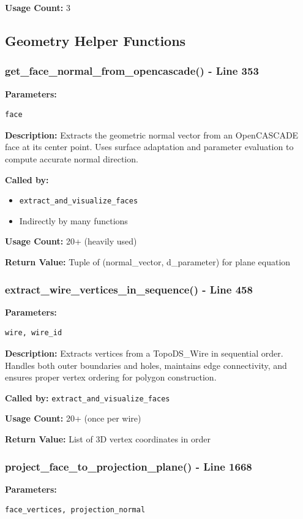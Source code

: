 \documentclass[11pt,a4paper]{article}
\begin{document}
\textbf{Usage Count:} 3

\subsection{Geometry Helper Functions}

\subsubsection{get\_face\_normal\_from\_opencascade() - Line 353}
\textbf{Parameters:}
\begin{lstlisting}[language=Python]
face
\end{lstlisting}

\textbf{Description:}
Extracts the geometric normal vector from an OpenCASCADE face at its center point. Uses surface adaptation and parameter evaluation to compute accurate normal direction.

\textbf{Called by:}
\begin{itemize}
    \item \texttt{extract\_and\_visualize\_faces}
    \item Indirectly by many functions
\end{itemize}

\textbf{Usage Count:} 20+ (heavily used)

\textbf{Return Value:} Tuple of (normal\_vector, d\_parameter) for plane equation

\subsubsection{extract\_wire\_vertices\_in\_sequence() - Line 458}
\textbf{Parameters:}
\begin{lstlisting}[language=Python]
wire, wire_id
\end{lstlisting}

\textbf{Description:}
Extracts vertices from a TopoDS\_Wire in sequential order. Handles both outer boundaries and holes, maintains edge connectivity, and ensures proper vertex ordering for polygon construction.

\textbf{Called by:} \texttt{extract\_and\_visualize\_faces}

\textbf{Usage Count:} 20+ (once per wire)

\textbf{Return Value:} List of 3D vertex coordinates in order

\subsubsection{project\_face\_to\_projection\_plane() - Line 1668}
\textbf{Parameters:}
\begin{lstlisting}[language=Python]
face_vertices, projection_normal
\end{lstlisting}
\end{document}
